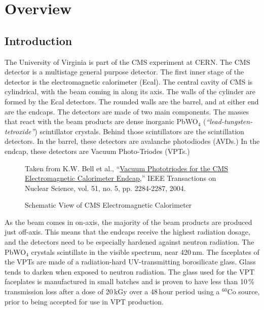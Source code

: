 
\chapter{Overview}
\label{sec:eq_intro}

\section{Introduction}
\label{sec:eq_intro:intro}

The University of Virginia is part of the CMS experiment at CERN.  The CMS detector is a multistage general purpose detector.  The first inner stage of the detector is the electromagnetic calorimeter (Ecal).  The central cavity of CMS is cylindrical, with the beam coming in along its axis.  The walls of the cylinder are formed by the Ecal detectors.  The rounded walls are the barrel, and at either end are the endcaps.  The detectors are made of two main components.  The masses that react with the beam products are dense inorganic PbWO$_4$ (\textit{``lead-tungsten-tetroxide''}) scintillator crystals.  Behind those scintillators are the scintillation detectors.  In the barrel, these detectors are avalanche photodiodes (AVDs.)  In the endcap, these detectors are Vacuum Photo-Triodes (VPTs.)

\begin{figure}[htbp]
  \centering
  \parbox{0.75\textwidth}{\tiny
    Taken from K.W. Bell et al., ``\href{papers/1344324}{Vacuum Phototriodes for the CMS Electromagnetic Calorimeter Endcap},'' IEEE Transactions on Nuclear Science, vol. 51, no. 5, pp. 2284-2287, 2004.}
  \caption{Schematic View of CMS Electromagnetic Calorimeter}
  \label{fig:eq_intro:ecal}
\end{figure}

As the beam comes in on-axis, the majority of the beam products are produced just off-axis.  This means that the endcaps receive the highest radiation dosage, and the detectors need to be especially hardened against neutron radiation.  The PbWO$_4$ crystals scintillate in the visible spectrum, near 420\,nm.   The faceplates of the VPTs are made of a radiation-hard UV-transmitting borosilicate glass.  Glass tends to darken when exposed to neutron radiation.  The glass used for the VPT faceplates is manufactured in small batches and is proven to have less than 10\,\% transmission loss after a dose of 20\,kGy over a 48\,hour period using a $^{60}$Co source, prior to being accepted for use in VPT production.

